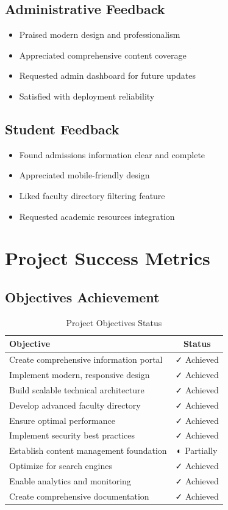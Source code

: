 \documentclass[12pt,a4paper]{report}
\begin{document}
\subsection{Administrative Feedback}
\begin{itemize}
    \item Praised modern design and professionalism
    \item Appreciated comprehensive content coverage
    \item Requested admin dashboard for future updates
    \item Satisfied with deployment reliability
\end{itemize}

\subsection{Student Feedback}
\begin{itemize}
    \item Found admissions information clear and complete
    \item Appreciated mobile-friendly design
    \item Liked faculty directory filtering feature
    \item Requested academic resources integration
\end{itemize}

\section{Project Success Metrics}

\subsection{Objectives Achievement}

\begin{table}[H]
\centering
\begin{tabular}{|p{7cm}|c|}
\hline
\textbf{Objective} & \textbf{Status} \\ \hline
Create comprehensive information portal & ✓ Achieved \\ \hline
Implement modern, responsive design & ✓ Achieved \\ \hline
Build scalable technical architecture & ✓ Achieved \\ \hline
Develop advanced faculty directory & ✓ Achieved \\ \hline
Ensure optimal performance & ✓ Achieved \\ \hline
Implement security best practices & ✓ Achieved \\ \hline
Establish content management foundation & ◐ Partially \\ \hline
Optimize for search engines & ✓ Achieved \\ \hline
Enable analytics and monitoring & ✓ Achieved \\ \hline
Create comprehensive documentation & ✓ Achieved \\ \hline
\end{tabular}
\caption{Project Objectives Status}
\end{table}
\end{document}
